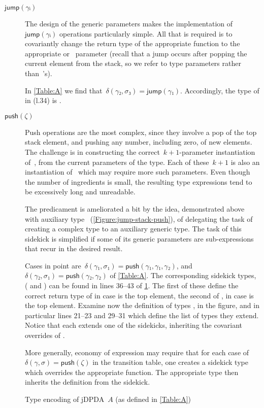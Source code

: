 \begin{description}
  \item[$\textsf{jump}(γᵢ)$]
  The design of the generic parameters makes the implementation of~$\textsf{jump}(γᵢ)$
    operations particularly simple.
  All that is required is to covariantly change the return type of the
    appropriate  function to the appropriate  or~ parameter
    (recall that a jump occurs after popping the current element from the stack, so
    we refer to  type parameters rather than~'s).
  \par
  In \cref{Table:A} we find that~$δ(γ₂,σ₃) =\textsf{jump}(γ₁)$. Accordingly, the type of 
  in  (l.34) is .

  \item[$\textsf{push}(ζ)$]
  Push operations are the most complex, since they involve a pop of the top stack element,
    and pushing any number, including zero, of new elements.
  The challenge is in constructing the correct~$k+1$-parameter instantiation of~,
    from the current parameters of the type.
  Each of these~$k+1$ is also an instantiation of~ which may require more such
    parameters.
  Even though the number of ingredients is small, the resulting type expressions
    tend to be excessively long and unreadable.
  \par
  The predicament is ameliorated a bit by the idea,
    demonstrated above with auxiliary type~
    (\cref{Figure:jump-stack-push}),
    of delegating the task of creating a complex type to an auxiliary
    generic type.
  The task of this sidekick is simplified if some of its generic
  parameters are sub-expressions that recur in the desired
  result.
  \par
  Cases in point
    are~$δ(γ₁,σ₁)=\textsf{push}(γ₁,γ₁,γ₂)$, and~$δ(γ₂,σ₁)=\textsf{push}(γ₂,γ₂)$ of \cref{Table:A}.
  The corresponding sidekick types,
    ( and )
    can be found in lines 36--43 of \cref{Figure:A}.
  The first of these define the correct return type
    of  in case  is the top element,
    the second of , in case  is the top element.
  Examine now the definition of types , in the figure,
    and in particular lines 21--23 and 29--31 which define the list of types they extend.
  Notice that each extends one of the sidekicks, inheriting the covariant
    overrides of .
  \par
  More generally, economy of expression may require that for each case
    of~$δ(γ,σ)=\textsf{push}(ζ)$ in the transition table,
    one creates a sidekick type which
      overrides the appropriate  function.
  The appropriate  type then inherits the definition
    from the sidekick.
\end{description}

\begin{figure}[htbp]
  \caption{\label{Figure:A}Type encoding of jDPDA~$A$ (as defined in \cref{Table:A})}
\end{figure}
